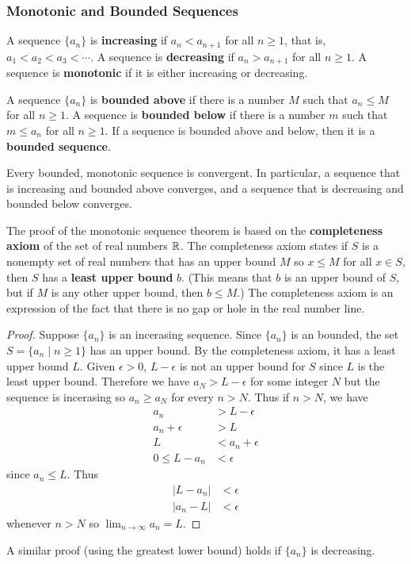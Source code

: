 \subsubsection*{Monotonic and Bounded Sequences}
\begin{definition}
    A sequence \(\{a_n\}\) is \textbf{increasing} if \(a_n<a_{n+1}\) for all
    \(n\geq 1\), that is, \(a_1<a_2<a_3<\cdots\).
    A sequence is \textbf{decreasing} if \(a_n>a_{n+1}\) for all \(n\geq 1\).
    A sequence is \textbf{monotonic} if it is either increasing or decreasing.
\end{definition}
\begin{definition}
    A sequence \(\{a_n\}\) is \textbf{bounded above} if there is a number
    \(M\) such that \(a_n\leq M\) for all \(n\geq 1\).
    A sequence is \textbf{bounded below} if there is a number
    \(m\) such that \(m\leq a_n\) for all \(n\geq 1\).
    If a sequence is bounded above and below, then it is a
    \textbf{bounded sequence}.
\end{definition}
\begin{theorem}
    Every bounded, monotonic sequence is convergent.
    In particular, a sequence that is increasing and bounded above converges,
    and a sequence that is decreasing and bounded below converges.
\end{theorem}
The proof of the monotonic sequence theorem is based on the
\textbf{completeness axiom} of the set of real numbers \(\mathbb{R}\).
The completeness axiom states if \(S\) is a nonempty set of real numbers that
has an upper bound \(M\) so \(x\leq M\) for all \(x\in S\), then \(S\) has a
\textbf{least upper bound} \(b\).
(This means that \(b\) is an upper bound of \(S\),
but if \(M\) is any other upper bound, then \(b\leq M\).)
The completeness axiom is an expression of the fact that there is no gap or
hole in the real number line.
\begin{proof}
    Suppose \(\{a_n\}\) is an incerasing sequence.
    Since \(\{a_n\}\) is an bounded, the set \(S=\{a_n\mid n\geq 1\}\) has an
    upper bound.
    By the completeness axiom, it has a least upper bound \(L\).
    Given \(\epsilon>0\), \(L-\epsilon\) is not an upper bound for \(S\) since
    \(L\) is the least upper bound.
    Therefore we have \(a_N>L-\epsilon\) for some integer \(N\) but the
    sequence is incerasing so \(a_n\geq a_N\) for every \(n>N\).
    Thus if \(n>N\), we have
    \begin{align*}
        a_n &> L-\epsilon \\
        a_n+\epsilon &> L \\
        L &< a_n +\epsilon \\
        0 \leq L-a_n &< \epsilon
    \end{align*}
    since \(a_n\leq L\).
    Thus
    \begin{align*}
        |L-a_n| &< \epsilon \\
        |a_n-L| &< \epsilon
    \end{align*}
    whenever \(n>N\) so \(\displaystyle{\lim_{n\to\infty}a_n=L}\).
\end{proof}
A similar proof (using the greatest lower bound) holds if \(\{a_n\}\) is
decreasing.